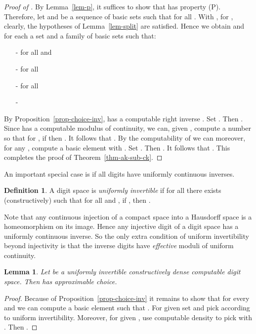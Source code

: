 \documentclass[microtype]{jloganal}
\theoremstyle{plain}
\newtheorem{lemma}[theorem]{Lemma}
\theoremstyle{definition}
\newtheorem{definition}[theorem]{Definition}
\begin{document}
\begin{proof}[Proof of ]
 By Lemma~\ref{lem-p}, it suffices
to show that  has property (P). 
Therefore, let  and  be a sequence of 
basic sets such that  for all . With
, for , clearly, the hypotheses of Lemma~\ref{lem-split}
are satisfied. Hence we obtain  and for each  a set 
 and a family of basic sets 
such that:
\begin{itemize}
\item[-]  for all  and 
\item[-]  for all 
\item[-]  for all 
\item[-] 
\end{itemize}
By Proposition~\ref{prop-choice-inv},  has a computable right inverse . Set . Then . Since  has a computable modulus of continuity, we can, given , compute a number  so that for , if  then . It follows that . By the computability of 
we can moreover, for any , compute a basic element  with .
Set . Then . It follows that . This completes the proof of Theorem~\ref{thm-ak-sub-ck}.
\end{proof}
 
 An important special case is if all digits have uniformly continuous inverses.
 
 \begin{definition}
 \label{def-unifinv}
 A digit space  is \emph{uniformly invertible} if for all  there exists (constructively)  such that for all  and , if , then .
 \end{definition}
 
Note that any continuous injection of a compact space into a 
Hausdorff space is a homeomorphism on its image. Hence any injective
digit of a digit space has a uniformly continuous inverse. So the
only extra condition of uniform invertibility beyond injectivity is that
the inverse digits have \emph{effective} moduli of uniform continuity.

\begin{lemma}
\label{lem-unifinv-uniffib}
Let  be a uniformly invertible constructively dense computable digit space. Then  has approximable choice. 
\end{lemma}
\begin{proof}
Because of Proposition~\ref{prop-choice-inv} it remains to show that for every  and  we can compute a basic element  such that . For given  set  and pick  according to uniform invertibility. Moreover, for given , use computable density to pick  with . Then .
 \end{proof}
\end{document}
